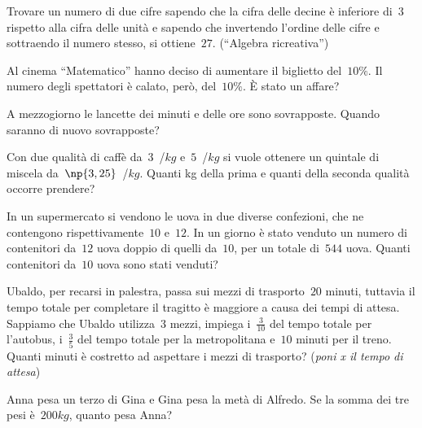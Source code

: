 \begin{multicols}{2}
\begin{esercizio}
\label{ese:16.45}
Trovare un numero di due cifre sapendo che la cifra delle decine è inferiore di~$3$ rispetto alla cifra delle unità e sapendo che invertendo l'ordine delle cifre e sottraendo il numero stesso, si ottiene~$27$. (``Algebra ricreativa'')
\end{esercizio}

\begin{esercizio}
\label{ese:16.46}
Al cinema ``Matematico'' hanno deciso di aumentare il biglietto del~$10\%$. Il numero degli spettatori è calato, però, del~$10\%$. È stato un affare?
\end{esercizio}

\begin{esercizio}
\label{ese:16.47}
A mezzogiorno le lancette dei minuti e delle ore sono sovrapposte. Quando saranno di nuovo sovrapposte?
\end{esercizio}

\begin{esercizio}
\label{ese:16.48}
Con due qualità di caffè da~$3$~\officialeuro/$\unit{kg}$ e~$5$~\officialeuro/$\unit{kg}$ si vuole ottenere un quintale di miscela da~$\np{3,25}$~\officialeuro/$\unit{kg}$. Quanti kg della prima e quanti della seconda qualità occorre prendere?
\end{esercizio}

\begin{esercizio}[\Ast]
\label{ese:16.49}
In un supermercato si vendono le uova in due diverse confezioni, che ne contengono rispettivamente~$10$ e~$12$. In un giorno è stato venduto un numero di contenitori da~$12$ uova doppio di quelli da~$10$, per un totale di~$544$ uova. Quanti contenitori da~$10$ uova sono stati venduti?
\end{esercizio}

\begin{esercizio}[\Ast]
\label{ese:16.50}
Ubaldo, per recarsi in palestra, passa sui mezzi di trasporto~$20$ minuti, tuttavia il tempo totale per completare il tragitto è maggiore a causa dei tempi di attesa. Sappiamo che Ubaldo utilizza~$3$ mezzi, impiega i~$\frac{3}{10}$ del tempo totale per l'autobus, i~$\frac{3}{5}$ del tempo totale per la metropolitana e~$10$ minuti per il treno. Quanti minuti è costretto ad aspettare i mezzi di trasporto? (\emph{poni x il tempo di attesa})
\end{esercizio}

\begin{esercizio}[\Ast]
\label{ese:16.51}
Anna pesa un terzo di Gina e Gina pesa la metà di Alfredo. Se la somma dei tre pesi è~$200\unit{kg}$, quanto pesa Anna?
\end{esercizio}


\end{multicols}

